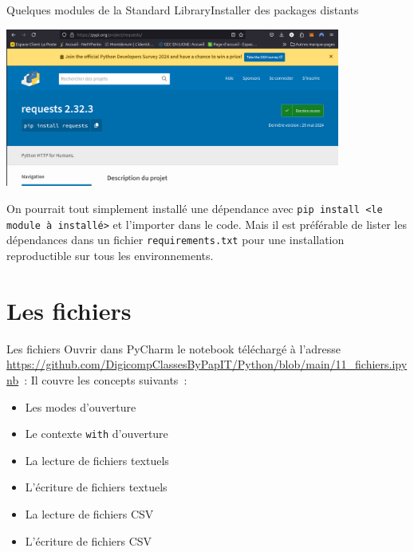 \documentclass{beamer}
\begin{document}
    \begin{frame}{Quelques modules de la Standard Library}{Installer des packages distants}
        \begin{center}
            \includegraphics[width=11cm]{image/pypi-requests-page}
        \end{center}
        \begin{dangercolorbox}
            On pourrait tout simplement installé une dépendance avec \lstinline{pip install <le module à installé>} et l'importer dans le code.
            Mais il est préférable de lister les dépendances dans un fichier \lstinline{requirements.txt} pour une installation reproductible sur tous les environnements.
        \end{dangercolorbox}
    \end{frame}


    \section{Les fichiers}\label{sec:files}

    \begin{frame}{Les fichiers}
        Ouvrir dans PyCharm le notebook téléchargé à l'adresse \url{https://github.com/DigicompClassesByPapIT/Python/blob/main/11_fichiers.ipynb}~:
        Il couvre les concepts suivants~:
        \begin{itemize}
            \item Les modes d'ouverture
            \item Le contexte \lstinline{with} d'ouverture
            \item La lecture de fichiers textuels
            \item L'écriture de fichiers textuels
            \item La lecture de fichiers CSV
            \item L'écriture de fichiers CSV
        \end{itemize}
    \end{frame}
\end{document}
